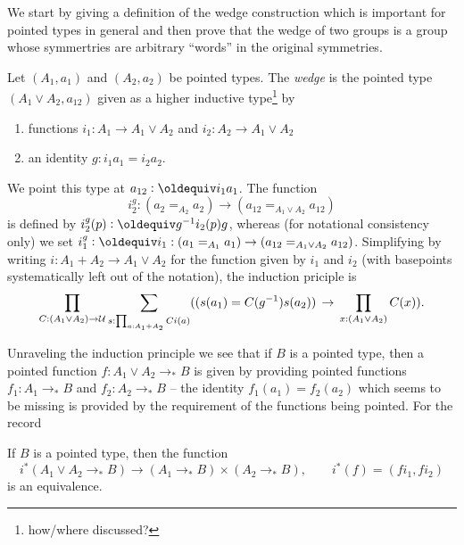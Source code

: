 
We start by giving a definition of the wedge construction which is important for pointed types in general and then prove that the wedge of two groups is a group whose symmertries are arbitrary ``words'' in the original symmetries.

\begin{definition}
  \label{def:wedge}
  Let $(A_1,a_1)$ and $(A_2,a_2)$ be pointed types.  The \emph{wedge} is the pointed type $(A_1\vee A_2,a_{12})$ given as a higher inductive type\footnote{how/where discussed?} by
  \begin{enumerate}
  \item functions $i_1:A_1\to A_1\vee A_2$ and $i_2:A_2\to A_1\vee A_2$
  \item an identity $g:i_1a_1=i_2a_2$.
  \end{enumerate}
We point this type at $a_{12}\defequi i_1a_1$.
  The function 
$$i^g_2:(a_2=_{A_2}a_2)\to(a_{12}=_{A_1\vee A_2}a_{12})$$ 
is defined by $i^g_2(p)\defequi g^{-1}i_2(p)g$, whereas (for notational consistency only) we set $i_1^g\defequi i_1:(a_1=_{A_1}a_1)\to(a_{12}=_{A_1\vee A_2}a_{12})$.
Simplifying by writing $i:A_1+A_2\to A_1\vee A_2$ for the function given by $i_1$ and $i_2$ (with basepoints systematically left out of the notation), the induction priciple is
$$\prod_{C:(A_1\vee A_2)\to\UU}\sum_{s:\prod_{a:A_1+A_2}Ci(a)}%
((s(a_1)=C(g^{-1})s(a_2))\,\to\,\prod_{x:(A_1\vee A_2)}C(x)).$$
\end{definition}


Unraveling the induction principle we see that if $B$ is a pointed type, then a  pointed function $f:A_1\vee A_2\to_* B$ is given by providing pointed functions $f_1:A_1\to_* B$ and $f_2:A_2\to_* B$  -- the identity $f_1(a_1)=f_2(a_2)$ which seems to be missing is provided by the requirement of the functions being pointed.  For the record
\begin{lemma}
  \label{lem:univvee}
  If $B$ is a pointed type, then the function 
  $$i^*(A_1\vee A_2\to_*B)\to(A_1\to_*B)\times(A_2\to_*B),\qquad i^*(f)=(fi_1,fi_2)
$$
is an equivalence.
\end{lemma}

